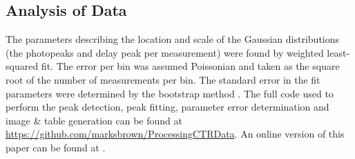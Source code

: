 \subsection{Analysis of Data}
The parameters describing the location and scale of the Gaussian distributions (the photopeaks and delay peak per measurement) were found by weighted least-squared fit. The error per bin was assumed Poissonian and taken as the square root of the number of measurements per bin. The standard error in the fit parameters were determined by the bootstrap method \cite{degroot2012probability}. The full code used to perform the peak detection, peak fitting, parameter error determination and image \& table generation can be found at \href{https://github.com/marksbrown/ProcessingCTRData}{https://github.com/marksbrown/ProcessingCTRData}. An online version of this paper can be found at \cite{Brown2014}.